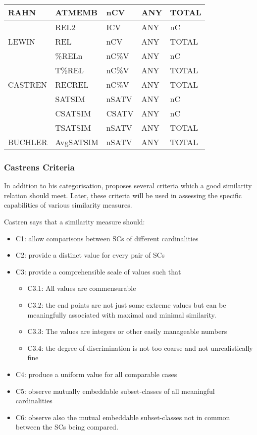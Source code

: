 \documentclass{article}
\begin{document}
\begin{table}[htb]
\begin{center}
\begin{tabular}{lllll}
 RAHN        &  ATMEMB      &  nCV     &  ANY   &  TOTAL    \\
\hline
             &  REL2        &  ICV     &  ANY   &  nC       \\
 LEWIN       &  REL         &  nCV     &  ANY   &  TOTAL    \\
\hline
             &  \%RELn      &  nC\%V   &  ANY   &  nC       \\
             &  T\%REL      &  nC\%V   &  ANY   &  TOTAL    \\
 CASTREN     &  RECREL      &  nC\%V   &  ANY   &  TOTAL    \\
\hline
             &  SATSIM      &  nSATV   &  ANY   &  nC       \\
             &  CSATSIM     &  CSATV   &  ANY   &  nC       \\
             &  TSATSIM     &  nSATV   &  ANY   &  TOTAL    \\
 BUCHLER     &  AvgSATSIM   &  nSATV   &  ANY   &  TOTAL    \\
\hline
\end{tabular}
\end{center}
\end{table}
\subsubsection{Castrens Criteria}
\label{sec-3-4-3}

In addition to his categorisation, \citet{Castren1994} proposes several
criteria which a good similarity relation should meet. Later, these
criteria will be used in assessing the specific capabilities of
various similarity measures. 

Castren says that a similarity measure should:
\begin{itemize}
\item C1: allow comparisons between SCs of different cardinalities
\item C2: provide a distinct value for every pair of SCs
\item C3: provide a comprehensible scale of values such that
\begin{itemize}
\item C3.1: All values are commensurable
\item C3.2: the end points are not just some extreme values but can be
    meaningfully associated with maximal and minimal similarity.
\item C3.3: The values are integers or other easily manageable numbers
\item C3.4: the degree of discrimination is not too coarse and not
    unrealistically fine
\end{itemize}
\item C4: produce a uniform value for all comparable cases
\item C5: observe mutually embeddable subset-classes of all meaningful
  cardinalities
\item C6: observe also the mutual embeddable subset-classes not in common
  between the SCs being compared.
\end{itemize}
\end{document}
